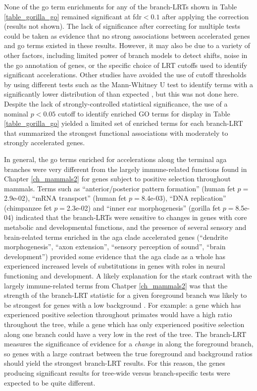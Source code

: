 None of the \ac{go} term enrichments for any of the branch-LRTs shown
in Table \ref{table_gorilla_go} remained significant at \ac{fdr}$<0.1$
after applying the \citet{Benjamini1995} correction (results not
shown). The lack of significance after correcting for multiple tests
could be taken as evidence that no strong associations between
accelerated genes and \ac{go} terms existed in these results. However,
it may also be due to a variety of other factors, including limited
power of branch models to detect \dnds shifts, noise in the \ac{go}
annotation of genes, or the specific choice of LRT cutoffs used to
identify significant accelerations. Other studies have avoided the use
of cutoff thresholds by using different tests such as the Mann-Whitney
U test to identify terms with a significantly lower distribution of
\pvs than expected \citep{Clark2003,Kosiol2008}, but this was not done
here. Despite the lack of strongly-controlled statistical
significance, the use of a nominal $p<0.05$ cutoff to identify
enriched GO terms for display in Table \ref{table_gorilla_go} yielded
a limited set of enriched terms for each branch-LRT that summarized
the strongest functional associations with moderately to strongly
accelerated genes.

In general, the \ac{go} terms enriched for accelerations along the
terminal \ac{aga} branches were very different from the largely
immune-related functions found in Chapter \ref{ch_mammals2} for genes
subject to positive selection throughout mammals. Terms such as
``anterior/posterior pattern formation'' (human \ac{fet} $p=$2.9e-02),
``mRNA transport'' (human \ac{fet} $p=$8.4e-03), ``DNA replication''
(chimpanzee \ac{fet} $p=$2.3e-02) and ``inner ear morphogenesis''
(gorilla \ac{fet} $p=$8.5e-04) indicated that the branch-LRTs were
sensitive to \dnds changes in genes with core metabolic and
developmental functions, and the presence of several sensory and
brain-related terms enriched in the \ac{aga} clade accelerated genes
(``dendrite morphogenesis'', ``axon extension'', ``sensory perception
of sound'', ``brain development'') provided some evidence that the
\ac{aga} clade as a whole has experienced increased levels of \nsyn
substitutions in genes with roles in neural functioning and
development. A likely explanation for the stark contrast with the
largely immune-related terms from Chatper \ref{ch_mammals2} was that
the strength of the branch-LRT statistic for a given foreground branch
was likely to be strongest for genes with a low background \dnds. For
example: a gene which has experienced positive selection throughout
primates would have a high \dnds ratio throughout the tree, while a
gene which has only experienced positive selection along one branch
could have a very low \dnds in the rest of the tree. The branch-LRT
measures the significance of evidence for a \emph{change} in \dnds
along the foreground branch, so genes with a large contrast between
the true foreground and background \dnds ratios should yield the
strongest branch-LRT results. For this reason, the genes producing
significant results for tree-wide versus branch-specific tests were
expected to be quite different.

